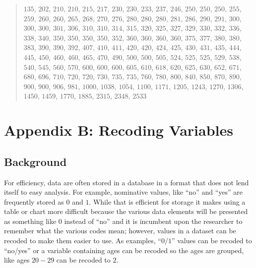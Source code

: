 \begin{quote}
  $ 135 $, $ 202 $, $ 210 $, $ 210 $, $ 215 $, $ 217 $, $ 230 $, $ 230 $, $ 233 $, $ 237 $, $ 246 $, $ 250 $, $ 250 $, $ 250 $, $ 255 $, $ 259 $, $ 260 $, $ 260 $, $ 265 $, $ 268 $, $ 270 $, $ 276 $, $ 280 $, $ 280 $, $ 280 $, $ 281 $, $ 286 $, $ 290 $, $ 291 $, $ 300 $, $ 300 $, $ 300 $, $ 301 $, $ 306 $, $ 310 $, $ 310 $, $ 314 $, $ 315 $, $ 320 $, $ 325 $, $ 327 $, $ 329 $, $ 330 $, $ 332 $, $ 336 $, $ 338 $, $ 340 $, $ 350 $, $ 350 $, $ 350 $, $ 350 $, $ 352 $, $ 360 $, $ 360 $, $ 360 $, $ 360 $, $ 375 $, $ 377 $, $ 380 $, $ 380 $, $ 383 $, $ 390 $, $ 390 $, $ 392 $, $ 407 $, $ 410 $, $ 411 $, $ 420 $, $ 420 $, $ 424 $, $ 425 $, $ 430 $, $ 431 $, $ 435 $, $ 444 $, $ 445 $, $ 450 $, $ 460 $, $ 460 $, $ 465 $, $ 470 $, $ 490 $, $ 500 $, $ 500 $, $ 505 $, $ 524 $, $ 525 $, $ 525 $, $ 529 $, $ 538 $, $ 540 $, $ 545 $, $ 560 $, $ 570 $, $ 600 $, $ 600 $, $ 600 $, $ 605 $, $ 610 $, $ 618 $, $ 620 $, $ 625 $, $ 630 $, $ 652 $, $ 671 $, $ 680 $, $ 696 $, $ 710 $, $ 720 $, $ 720 $, $ 730 $, $ 735 $, $ 735 $, $ 760 $, $ 780 $, $ 800 $, $ 840 $, $ 850 $, $ 870 $, $ 890 $, $ 900 $, $ 900 $, $ 906 $, $ 981 $, $ 1000 $, $ 1038 $, $ 1054 $, $ 1100 $, $ 1171 $, $ 1205 $, $ 1243 $, $ 1270 $, $ 1306 $, $ 1450 $, $ 1459 $, $ 1770 $, $ 1885 $, $ 2315 $, $ 2348 $, $ 2533 $
\end{quote}

\section{Appendix B: Recoding Variables} \label{app:b}

\subsection{Background}

For efficiency, data are often stored in a database in a format that does not lend itself to easy analysis. For example, nominative values, like ``no'' and ``yes'' are frequently stored as $ 0 $ and $ 1 $. While that is efficient for storage it makes using a table or chart more difficult because the various data elements will be presented as something like $ 0 $ instead of ``no'' and it is incumbent upon the researcher to remember what the various codes mean; however, values in a dataset can be recoded to make them easier to use. As examples, ``$ 0 / 1 $'' values can be recoded to ``no/yes'' or a variable containing ages can be recoded so the ages are grouped, like ages $ 20 - 29 $ can be recoded to $ 2 $. 

